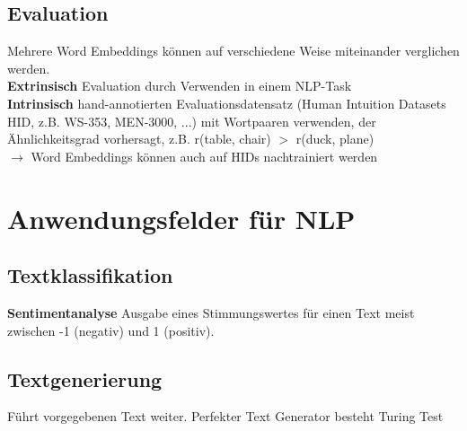 \documentclass[12pt]{article}
\begin{document}
	\subsection{Evaluation}
	Mehrere Word Embeddings können auf verschiedene Weise miteinander verglichen werden.\\
	\textbf{Extrinsisch} Evaluation durch Verwenden in einem NLP-Task\\
	\textbf{Intrinsisch} hand-annotierten Evaluationsdatensatz (Human Intuition Datasets HID, z.B. WS-353, MEN-3000, ...) mit Wortpaaren verwenden, der Ähnlichkeitsgrad vorhersagt, z.B. r(table, chair) $>$ r(duck, plane)\\
	$\rightarrow$ Word Embeddings können auch auf HIDs nachtrainiert werden

	\section{Anwendungsfelder für NLP}
	\subsection{Textklassifikation}
	\textbf{Sentimentanalyse} Ausgabe eines Stimmungswertes für einen Text meist zwischen -1 (negativ) und 1 (positiv).

	\subsection{Textgenerierung}
	Führt vorgegebenen Text weiter. Perfekter Text Generator besteht Turing Test
	
\end{document}
